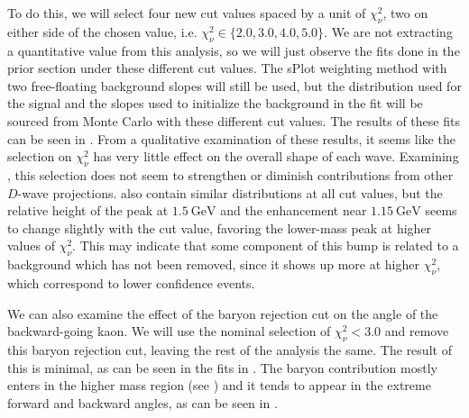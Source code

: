 To do this, we will select four new cut values spaced by a unit of $\chi^2_\nu$, two on either side of the chosen value, i.e. $\chi^2_\nu \in \{2.0, 3.0, 4.0, 5.0\}$. We are not extracting a quantitative value from this analysis, so we will just observe the fits done in the prior section under these different cut values. The sPlot weighting method with two free-floating background slopes will still be used, but the distribution used for the signal and the slopes used to initialize the background in the fit will be sourced from Monte Carlo with these different cut values. The results of these fits can be seen in . From a qualitative examination of these results, it seems like the selection on $\chi^2_\nu$ has very little effect on the overall shape of each wave. Examining , this selection does not seem to strengthen or diminish contributions from other $D$-wave projections.  also contain similar distributions at all cut values, but the relative height of the peak at $\SI{1.5}{\giga\electronvolt}$ and the enhancement near $\SI{1.15}{\giga\electronvolt}$ seems to change slightly with the cut value, favoring the lower-mass peak at higher values of $\chi^2_\nu$. This may indicate that some component of this bump is related to a background which has not been removed, since it shows up more at higher $\chi^2_\nu$, which correspond to lower confidence events.


We can also examine the effect of the baryon rejection cut on the angle of the backward-going kaon. We will use the nominal selection of $\chi^2_\nu < 3.0$ and remove this baryon rejection cut, leaving the rest of the analysis the same. The result of this is minimal, as can be seen in the fits in . The baryon contribution mostly enters in the higher mass region (see ) and it tends to appear in the extreme forward and backward angles, as can be seen in .

